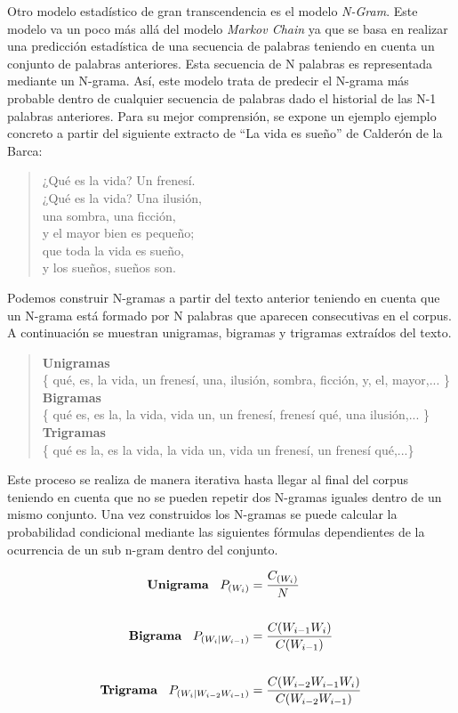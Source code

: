Otro modelo estadístico de gran transcendencia es el modelo \textit{N-Gram}. Este modelo va un poco más allá del modelo \textit{Markov Chain} ya que se basa en realizar una predicción estadística de una secuencia de palabras teniendo en cuenta un conjunto de palabras anteriores. Esta secuencia de N palabras es representada mediante un N-grama.
Así, este modelo trata de predecir el N-grama más probable dentro de cualquier secuencia de palabras dado el historial de las N-1 palabras anteriores. Para su mejor comprensión, se expone un ejemplo ejemplo concreto a partir del siguiente extracto de ``La vida es sueño'' de Calderón de la Barca:


\begin{verse}
	¿Qué es la vida? Un frenesí.\\
	¿Qué es la vida? Una ilusión,\\
	una sombra, una ficción,\\
	y el mayor bien es pequeño;\\
	que toda la vida es sueño,\\
	y los sueños, sueños son.\\
\end{verse}

Podemos construir N-gramas a partir del texto anterior teniendo en cuenta que un N-grama está formado por N palabras que aparecen consecutivas en el corpus. A continuación se muestran unigramas, bigramas y trigramas extraídos del texto.

\begin{verse}
	\textbf{Unigramas} \\
	\{ qué, es, la vida, un frenesí, una, ilusión, sombra, ficción, y, el, mayor,... \}\\
	\textbf{Bigramas} \\
	\{ qué es, es la, la vida, vida un, un frenesí, frenesí qué, una ilusión,... \}\\
	\textbf{Trigramas} \\
	\{ qué es la, es la vida, la vida un, vida un frenesí, un frenesí qué,...\}
\end{verse}


Este proceso se realiza de manera iterativa hasta llegar al final del corpus teniendo en cuenta que no se pueden repetir dos N-gramas iguales dentro de un mismo conjunto. Una vez construidos los N-gramas se puede calcular la probabilidad condicional mediante las siguientes fórmulas dependientes de la ocurrencia de un sub n-gram dentro del conjunto.

\begin{equation}
	\label{eq:probabilidadesngram}
	\begin{aligned}
		\textrm{\textbf{Unigrama}}\:\:\:\:
		P_{(W_i)} & = \frac{C_{(W_i)}}{N}   \\     
		\\
		\textrm{\textbf{Bigrama}}\:\:\:\:
		P_{(W_i|W_{i-1})} & = \frac{C(W_{i-1}W_i)}{C({W_{i-1}})}\\
		\\
		\textrm{\textbf{Trigrama}}\:\:\:\:
		P_{(W_i|W_{i-2}W_{i-1})} & = \frac{C(W_{i-2}W_{i-1}W_i)}{C({W_{i-2}W_{i-1}})}
	\end{aligned}
\end{equation}


